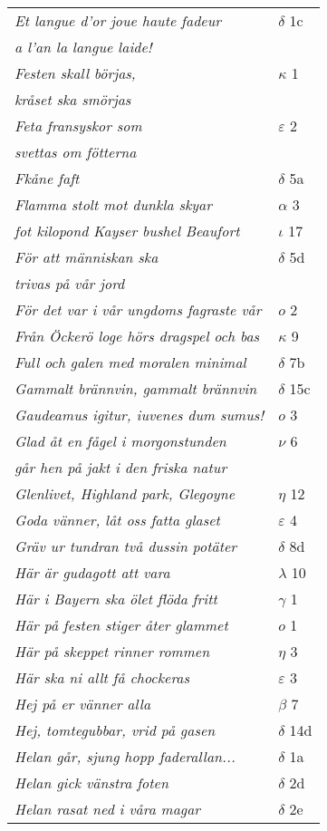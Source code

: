 \documentclass[a6paper,10pt]{article}
\begin{document}
\newpage
\setlength{\oddsidemargin}{-0.37in}
\begin{table}[!h]
\begin{tabular}{l l}
\textit{Et langue d'or joue haute fadeur}	&$\delta$ 1c\\
\textit{a l'an la langue laide!} &\\
\textit{Festen skall börjas,}	&$\kappa$ 1\\
\textit{kråset ska smörjas} &\\
\textit{Feta fransyskor som}	&$\varepsilon$ 2\\
\textit{svettas om fötterna} &\\
\textit{Fkåne faft}	&$\delta$ 5a\\
\textit{Flamma stolt mot dunkla skyar}	&$\alpha$ 3\\
\textit{fot kilopond Kayser bushel Beaufort}	&$\iota$ 17\\
\textit{För att människan ska}	&$\delta$ 5d\\
\textit{trivas på vår jord} &\\
\textit{För det var i vår ungdoms fagraste vår}	&$o$ 2\\
\textit{Från Öckerö loge hörs dragspel och bas}	&$\kappa$ 9\\
\textit{Full och galen med moralen minimal}	&$\delta$ 7b\\
\textit{Gammalt brännvin, gammalt brännvin}	&$\delta$ 15c\\
\textit{Gaudeamus igitur, iuvenes dum sumus!}	&$o$ 3\\
\textit{Glad åt en fågel i morgonstunden}	&$\nu$ 6\\
\textit{går hen på jakt i den friska natur} &\\
\textit{Glenlivet, Highland park, Glegoyne}	&$\eta$ 12\\
\textit{Goda vänner, låt oss fatta glaset}	&$\varepsilon$ 4\\
\textit{Gräv ur tundran två dussin potäter}	&$\delta$ 8d\\
\textit{Här är gudagott att vara}	&$\lambda$ 10\\
\textit{Här i Bayern ska ölet flöda fritt}	&$\gamma$ 1\\
\textit{Här på festen stiger åter glammet}	&$o$ 1\\
\textit{Här på skeppet rinner rommen}	&$\eta$ 3\\
\textit{Här ska ni allt få chockeras}	&$\varepsilon$ 3\\
\textit{Hej på er vänner alla}	&$\beta$ 7\\
\textit{Hej, tomtegubbar, vrid på gasen}	&$\delta$ 14d\\
\textit{Helan går, sjung hopp faderallan...}	&$\delta$ 1a\\
\textit{Helan gick  vänstra foten}	&$\delta$ 2d\\
\textit{Helan rasat ned i våra magar}	&$\delta$ 2e\\
\end{tabular}
\end{table}
\end{document}
